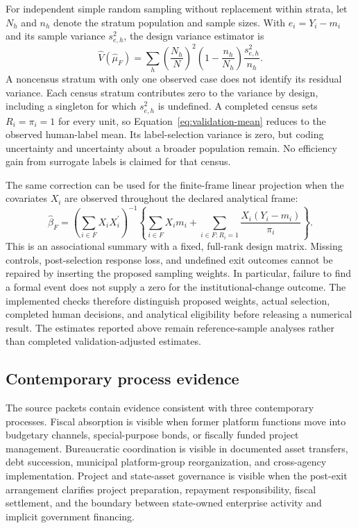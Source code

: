 For independent simple random sampling without replacement within strata,
let $N_h$ and $n_h$ denote the stratum population and sample sizes. With
$e_i=Y_i-m_i$ and its sample variance $s^2_{e,h}$, the design variance estimator is
\begin{equation}
\widehat V(\widehat\mu_F)=
\sum_h\left(\frac{N_h}{N}\right)^2
\left(1-\frac{n_h}{N_h}\right)\frac{s^2_{e,h}}{n_h}.
\label{eq:validation-variance}
\end{equation}
A noncensus stratum with only one observed case does not identify its residual
variance. Each census stratum contributes zero to the variance by design,
including a singleton for which $s^2_{e,h}$ is undefined. A completed census
sets $R_i=\pi_i=1$ for every unit, so
Equation~\ref{eq:validation-mean} reduces to the observed human-label mean.
Its label-selection variance is zero, but coding uncertainty and uncertainty
about a broader population remain. No efficiency gain from surrogate labels
is claimed for that census.

The same correction can be used for the finite-frame linear projection when
the covariates $X_i$ are observed throughout the declared analytical frame:
\begin{equation}
\widehat\beta_F=
\left(\sum_{i\in F}X_iX_i^{\prime}\right)^{-1}
\left\{\sum_{i\in F}X_im_i+
\sum_{i\in F:R_i=1}\frac{X_i(Y_i-m_i)}{\pi_i}\right\}.
\label{eq:validation-projection}
\end{equation}
This is an associational summary with a fixed, full-rank design matrix.
Missing controls, post-selection response loss, and undefined exit outcomes
cannot be repaired by inserting the proposed sampling weights. In particular,
failure to find a formal event does not supply a zero for the
institutional-change outcome. The implemented checks therefore distinguish proposed weights,
actual selection, completed human decisions, and analytical eligibility before
releasing a numerical result. The estimates reported above remain
reference-sample analyses rather than completed validation-adjusted estimates.

\subsection{Contemporary process evidence}

The source packets contain evidence consistent with three contemporary
processes. Fiscal absorption is visible when former platform functions move
into budgetary channels, special-purpose bonds, or fiscally funded project
management. Bureaucratic coordination is visible in documented asset
transfers, debt succession, municipal platform-group reorganization, and
cross-agency implementation. Project and state-asset governance is visible
when the post-exit arrangement clarifies project preparation, repayment
responsibility, fiscal settlement, and the boundary between state-owned
enterprise activity and implicit government financing.

